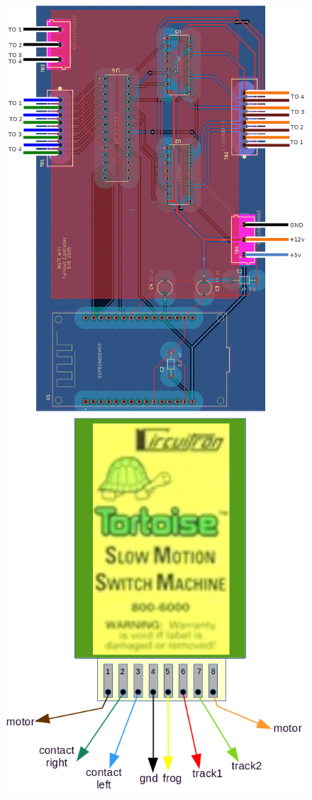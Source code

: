 \begin{figure}[H]
  \centering
    \includegraphics[scale=0.2]{../Images/turnout_pcb.png}\hfill
    \includegraphics[scale=0.45]{../Images/tortoise-wiring.png}

\end{figure}
